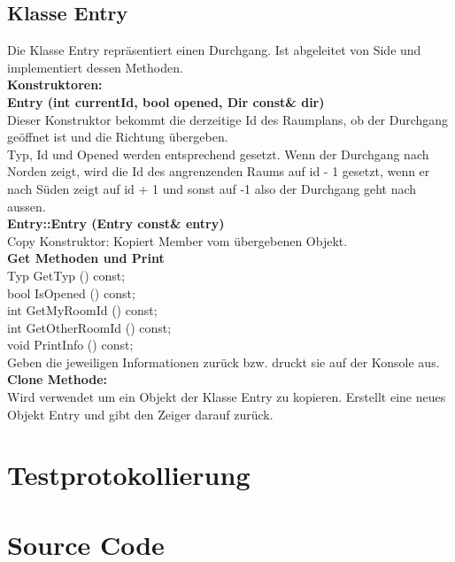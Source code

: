 \documentclass[12pt,a4paper]{article}
\begin{document}
\subsection {Klasse Entry} 
Die Klasse Entry repräsentiert einen Durchgang. Ist abgeleitet von Side und implementiert dessen Methoden. \\
\textbf {Konstruktoren:} \\
\textbf {Entry (int currentId, bool opened, Dir const\& dir)} \\
Dieser Konstruktor bekommt die derzeitige Id des Raumplans, ob der Durchgang geöffnet ist und die Richtung übergeben. \\
Typ, Id und Opened werden entsprechend gesetzt. Wenn der Durchgang nach Norden zeigt, wird die Id des angrenzenden Raums auf id - 1 gesetzt, wenn er nach Süden zeigt auf id + 1 und sonst auf -1 also der Durchgang geht nach aussen. \\
\textbf {Entry::Entry (Entry const\& entry)} \\
Copy Konstruktor: Kopiert Member vom übergebenen Objekt. \\
\textbf {Get Methoden und Print} \\
	Typ GetTyp () const; \\
	bool IsOpened () const; \\
	int GetMyRoomId () const; \\
	int GetOtherRoomId () const; \\
	void PrintInfo () const; \\
Geben die  jeweiligen Informationen zurück bzw. druckt sie auf der Konsole aus. \\
\textbf {Clone Methode:} \\
Wird verwendet um ein Objekt der Klasse Entry zu kopieren. Erstellt eine neues Objekt Entry und gibt den Zeiger darauf zurück. \\



\newpage
\section {Testprotokollierung} 


\newpage
\section {Source Code}



\newpage

\end{document}
